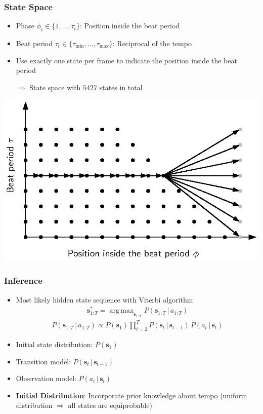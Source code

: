 \documentclass{beamer}
\DeclareMathOperator*{\argmax}{arg\,max}
\begin{document}
\begin{frame}
\frametitle{State Space}
\begin{itemize}
\item Phase $\phi_t \in \{1, \dots, \tau_t\}$: Position inside the beat period
\item Beat period $\tau_t \in \{ \tau_{\text{min}}, \dots, \tau_{\text{max}}\}$: Reciprocal of the tempo
\item Use exactly one state per frame to indicate the position inside the beat period
\item[$\Rightarrow$] State space with $5427$ states in total
\end{itemize}

\begin{minipage}{\textwidth} 
\centering
\includegraphics[scale=0.7]{figures/state_space.eps}
\end{minipage}

\end{frame}


\begin{frame}
\frametitle{Inference}

\begin{itemize}
\item Most likely hidden state sequence with Viterbi algorithm \cite{Viterbi1967}
\begin{align}
\mathbf s_{1:T}^* = \argmax_{\mathbf s_{1:T}} P(\mathbf s_{1:T}\,|\, a_{1:T})
\label{eq:most_likely_states}
\end{align} 
\vspace{-1.5em}
\begin{align}
 P(\mathbf s_{1:T}\,|\, a_{1:T}) \propto P(\mathbf s_1) \prod_{t=2}^T P(\mathbf s_t\,|\,\mathbf s_{t-1})\, P( a_t\,|\,\mathbf s_{t})
\end{align} 
\item Initial state distribution: $P(\mathbf s_1)$
\item Transition model: $P(\mathbf s_t\,|\,\mathbf s_{t-1})$ 
\item Observation model: $P(a_t\,|\,\mathbf s_{t})$
\vspace{1em}
\item \textbf{Initial Distribution}: Incorporate prior knowledge about tempo (uniform distribution $\Rightarrow$ all states are equiprobable)
\end{itemize}
\end{frame}
\end{document}
